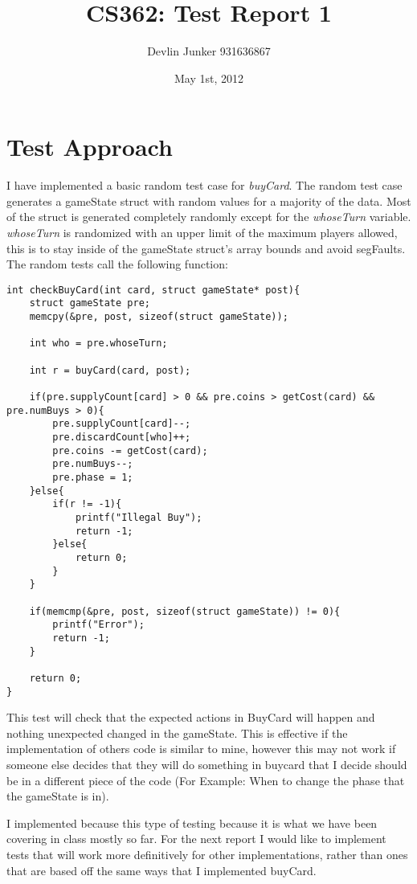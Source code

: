 \documentclass[letterpaper,12pt]{article}
\title{CS362: Test Report 1}
\date{May 1st, 2012}
\author{Devlin Junker 931636867}
\begin{document}
\maketitle


\section{Test Approach}
I have implemented a basic random test case for \emph{buyCard}. The random test case
generates a gameState struct with random values for a majority of the data. Most of
the struct is generated completely randomly except for the \emph{whoseTurn} variable.
\emph{whoseTurn} is randomized with an upper limit of the maximum players allowed, this 
is to stay inside of the gameState struct's array bounds and avoid segFaults. The random
tests call the following function: 

\begin{verbatim}
int checkBuyCard(int card, struct gameState* post){
	struct gameState pre;
	memcpy(&pre, post, sizeof(struct gameState));
	
	int who = pre.whoseTurn;
	
	int r = buyCard(card, post);
	
	if(pre.supplyCount[card] > 0 && pre.coins > getCost(card) && pre.numBuys > 0){
		pre.supplyCount[card]--;
		pre.discardCount[who]++;
		pre.coins -= getCost(card);
		pre.numBuys--;
		pre.phase = 1;
	}else{
		if(r != -1){
			printf("Illegal Buy");
			return -1;
		}else{
			return 0;
		}
	}
	
	if(memcmp(&pre, post, sizeof(struct gameState)) != 0){
		printf("Error");
		return -1;
	}
	
	return 0;
}
\end{verbatim}

This test will check that the expected actions in BuyCard will happen and 
nothing unexpected changed in the gameState. This is effective if the 
implementation of others code is similar to mine, however this may not work
if someone else decides that they will do something in buycard that I decide 
should be in a different piece of the code (For Example: When to change the
phase that the gameState is in).

\vspace{1em}

I implemented because this type of testing because it is what we have been
covering in class mostly so far. For the next report I would like to implement tests
that will work more definitively for other implementations, rather than ones that are
based off the same ways that I implemented buyCard.
\end{document}
